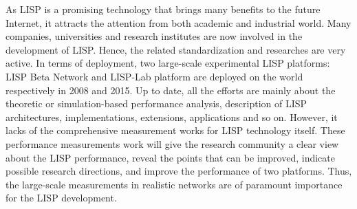 
As LISP is a promising technology that brings many benefits to the future Internet, it attracts the attention from both academic and industrial world. Many companies, universities and research institutes are now involved in the development of LISP. Hence, the related standardization and researches are very active. In terms of deployment, two large-scale experimental LISP platforms: LISP Beta Network and LISP-Lab platform are deployed on the world respectively in 2008 and 2015. Up to date, all the efforts are mainly about the theoretic or simulation-based performance analysis, description of LISP architectures, implementations, extensions, applications and so on. However, it lacks of the comprehensive measurement works for LISP technology itself. These performance measurements work will give the research community a clear view about the LISP performance, reveal the points that can be improved, indicate possible research directions, and improve the performance of two platforms. Thus, the large-scale measurements in realistic networks are of paramount importance for the LISP development.

